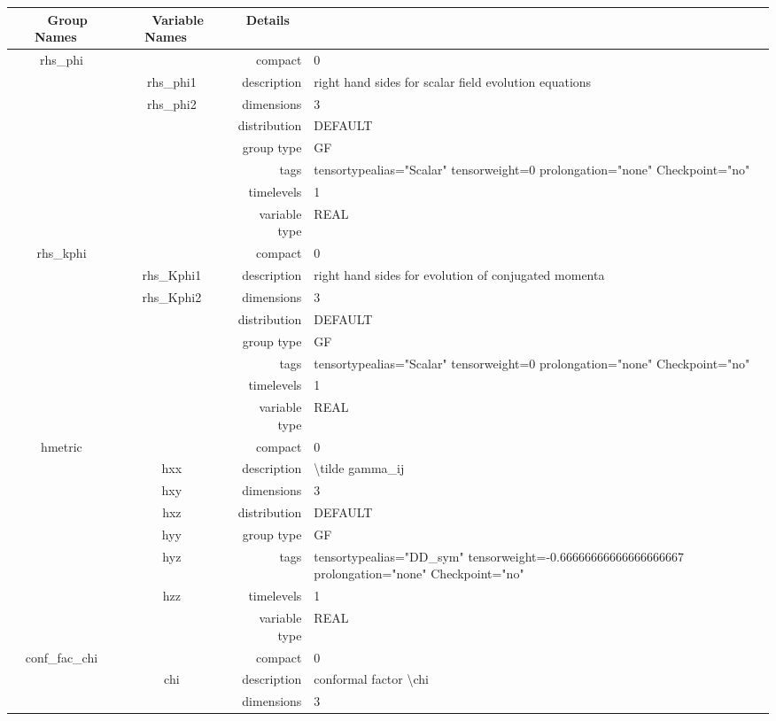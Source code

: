 \vspace{5mm}

\begin{tabular*}{150mm}{|c|c@{\extracolsep{\fill}}|rl|} \hline 
~ {\bf Group Names} ~ & ~ {\bf Variable Names} ~  &{\bf Details} ~ & ~\\ 
\hline 
rhs\_phi &  & compact & 0 \\ 
 & rhs\_phi1 & description & right hand sides for scalar field evolution equations \\ 
 & rhs\_phi2 & dimensions & 3 \\ 
 &  & distribution & DEFAULT \\ 
 &  & group type & GF \\ 
 &  & tags & tensortypealias="Scalar" tensorweight=0 prolongation="none" Checkpoint="no" \\ 
 &  & timelevels & 1 \\ 
 &  & variable type & REAL \\ 
\hline 
rhs\_kphi &  & compact & 0 \\ 
 & rhs\_Kphi1 & description & right hand sides for evolution of conjugated momenta \\ 
 & rhs\_Kphi2 & dimensions & 3 \\ 
 &  & distribution & DEFAULT \\ 
 &  & group type & GF \\ 
 &  & tags & tensortypealias="Scalar" tensorweight=0 prolongation="none" Checkpoint="no" \\ 
 &  & timelevels & 1 \\ 
 &  & variable type & REAL \\ 
\hline 
hmetric &  & compact & 0 \\ 
 & hxx & description & {\textbackslash}tilde gamma\_ij \\ 
 & hxy & dimensions & 3 \\ 
 & hxz & distribution & DEFAULT \\ 
 & hyy & group type & GF \\ 
 & hyz & tags & tensortypealias="DD\_sym" tensorweight=-0.66666666666666666667 prolongation="none" Checkpoint="no" \\ 
 & hzz & timelevels & 1 \\ 
 &  & variable type & REAL \\ 
\hline 
conf\_fac\_chi &  & compact & 0 \\ 
 & chi & description & conformal factor {\textbackslash}chi \\ 
 &  & dimensions & 3 \\ 

\end{tabular*}
